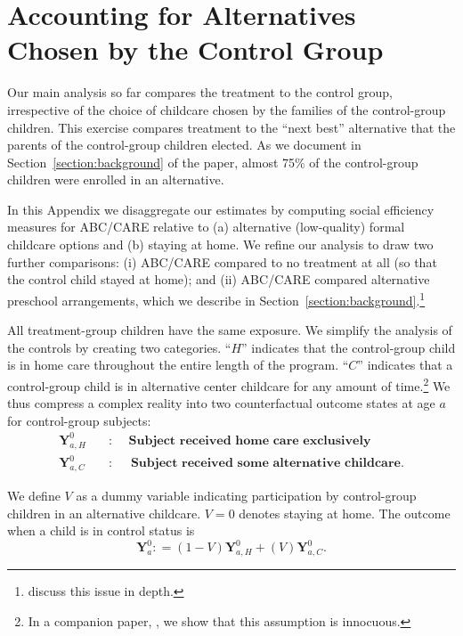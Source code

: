 

\section{Accounting for Alternatives Chosen by the Control Group} \label{appendix:cbaresultscont}

\noindent Our main analysis so far compares the treatment to the control group, irrespective of the choice of childcare chosen by the families of the control-group children. This exercise compares treatment to the ``next best'' alternative that the parents of the control-group children elected. As we document in Section~\ref{section:background} of the paper, almost 75\% of the control-group children were enrolled in an alternative.

\noindent In this Appendix we disaggregate our estimates by computing social efficiency measures for ABC/CARE relative to (a) alternative (low-quality) formal childcare options and (b) staying at home. We refine our analysis to draw two further comparisons: (i) ABC/CARE compared to no treatment at all (so that the control child stayed at home); and (ii) ABC/CARE compared alternative preschool arrangements, which we describe in Section~\ref{section:background}.\footnote{\cite{Garcia_Heckman_Ziff_2018_EER} discuss this issue in depth.}

\noindent All treatment-group children have the same exposure. We simplify the analysis of the controls by creating two categories. ``$H$'' indicates that the control-group child is in home care throughout the entire length of the program. ``$C$'' indicates that a control-group child is in alternative center childcare for any amount of time.\footnote{In a companion paper, \cite{Garcia_Heckman_Ziff_2018_EER}, we show that this assumption is innocuous.} We thus compress a complex reality into two counterfactual outcome states at age $a$ for control-group subjects:
\begin{align*}
\bm{Y}_{a,H}^0 \quad &: \quad \textbf{ Subject received home care exclusively} \\
\bm{Y}_{a,C}^0 \quad &: \quad \textbf{ Subject received some alternative childcare}.
\end{align*}

\noindent We define $V$ as a dummy variable indicating participation by control-group children in an alternative childcare. $V=0$ denotes staying at home. The outcome when a child is in control status is
\begin{equation}
\bm{Y}^0_a : = \left( 1 - V \right) \bm{Y}^0_{a,H} + \left( V \right) \bm{Y}^0_{a,C}. \label{eq:meandiff}
\end{equation}

